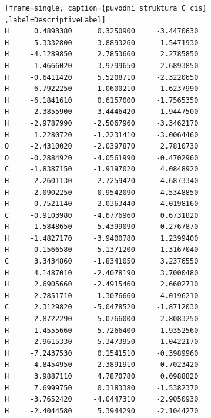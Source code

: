 \documentclass[
digital, %
table,   %
lof,     %
lot,     %
oneside,
]{fithesis3}
\begin{document}
\begin{lstlisting}[frame=single, caption={puvodni struktura C cis} ,label=DescriptiveLabel]
H      0.4893380      0.3250900     -3.4470630
H     -5.3332800      3.8893260      1.5471930
H     -4.1289850      2.7853660      2.2785850
H     -1.4666020      3.9799650     -2.6893850
H     -0.6411420      5.5208710     -2.3220650
H     -6.7922250     -1.0600210     -1.6237990
H     -6.1841610      0.6157000     -1.7565350
H     -2.3855900     -3.4446420     -1.9447500
H     -2.9787990     -2.5067960     -3.3462170
H      1.2280720     -1.2231410     -3.0064460
O     -2.4310020     -2.0397870      2.7810730
O     -0.2884920     -4.0561990     -0.4702960
C     -1.8387150     -1.9197020      4.0848920
H     -2.2601130     -2.7259420      4.6873340
H     -2.0902250     -0.9542090      4.5348850
H     -0.7521140     -2.0363440      4.0198160
C     -0.9103980     -4.6776960      0.6731820
H     -1.5848650     -5.4399090      0.2767870
H     -1.4827170     -3.9400780      1.2399400
H     -0.1566580     -5.1371200      1.3167040
C      3.3434860     -1.8341050      3.2376550
H      4.1487010     -2.4078190      3.7000480
H      2.6905660     -2.4915460      2.6602710
H      2.7851710     -1.3076660      4.0196210
C      2.3129820     -5.0478520     -1.8712030
H      2.8722290     -5.0766000     -2.8083250
H      1.4555660     -5.7266400     -1.9352560
H      2.9615330     -5.3473950     -1.0422170
H     -7.2437530      0.1541510     -0.3989960
H     -4.8454950      2.3891910      0.7023420
H      3.9887110      4.7870780      0.0988820
H      7.6999750      0.3183380     -1.5382370
H     -3.7652420     -4.0447310     -2.9050930
H     -2.4044580      5.3944290     -2.1044270

\end{lstlisting}
\newpage
\end{document}
